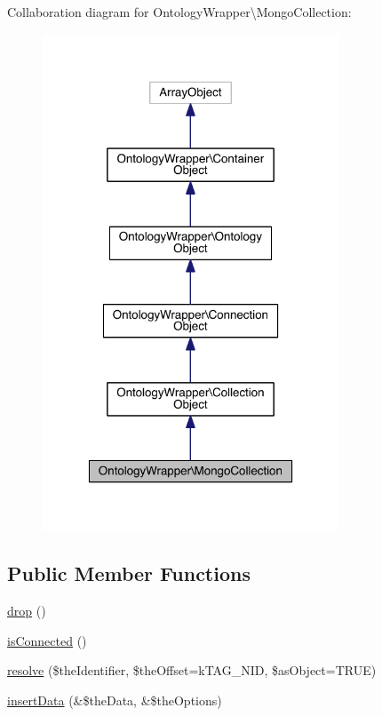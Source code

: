Collaboration diagram for Ontology\-Wrapper\textbackslash{}Mongo\-Collection\-:\nopagebreak
\begin{figure}[H]
\begin{center}
\leavevmode
\includegraphics[width=250pt]{class_ontology_wrapper_1_1_mongo_collection__coll__graph}
\end{center}
\end{figure}
\subsection*{Public Member Functions}
\begin{DoxyCompactItemize}
\item 
\hyperlink{class_ontology_wrapper_1_1_mongo_collection_aeee231e29de0e8767d85164a7e833c44}{drop} ()
\item 
\hyperlink{class_ontology_wrapper_1_1_mongo_collection_a560202c9b4f73c72f0ed80729308aa58}{is\-Connected} ()
\item 
\hyperlink{class_ontology_wrapper_1_1_mongo_collection_a60a5da13657f31f20ca01561d21404f4}{resolve} (\$the\-Identifier, \$the\-Offset=k\-T\-A\-G\-\_\-\-N\-I\-D, \$as\-Object=T\-R\-U\-E)
\item 
\hyperlink{class_ontology_wrapper_1_1_mongo_collection_aea1c5282361f10158efbb23319e53d03}{insert\-Data} (\&\$the\-Data, \&\$the\-Options)
\end{DoxyCompactItemize}
